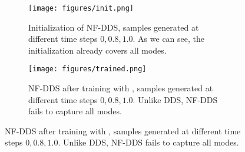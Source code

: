 \begin{figure}[t]
    \centering
    \begin{subfigure}{0.44\textwidth}
      \texttt{[image: figures/init.png]}
    \caption{Initialization of NF-DDS, samples generated at different time steps $0, 0.8, 1.0$. As we can see, the initialization already covers all modes.}
    \label{fig:init_nf_dds}  
    \end{subfigure}\hfill
    \begin{subfigure}{0.55\textwidth}
      \texttt{[image: figures/trained.png]}
    \caption{NF-DDS after training with , samples generated at different time steps $0, 0.8, 1.0$.
   Unlike DDS, NF-DDS fails to capture all modes.}
    \label{fig:nf_dds}  
    \end{subfigure}\vspace{-7pt}
\end{figure}

